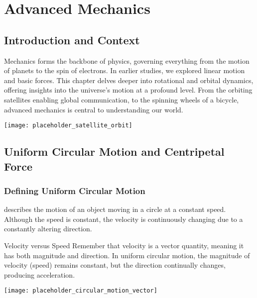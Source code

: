 \chapter{Advanced Mechanics}

\section{Introduction and Context}
\FloatBarrier
Mechanics forms the backbone of physics, governing everything from the motion of planets to the spin of electrons. In earlier studies, we explored linear motion and basic forces. This chapter delves deeper into rotational and orbital dynamics, offering insights into the universe's motion at a profound level. From the orbiting satellites enabling global communication, to the spinning wheels of a bicycle, advanced mechanics is central to understanding our world.

\begin{marginfigure}[0pt]
\texttt{[image: placeholder\_satellite\_orbit]}
\caption{Satellites and their orbits provide essential services such as communication, navigation, and weather forecasting.}
\end{marginfigure}

\section{Uniform Circular Motion and Centripetal Force}
\FloatBarrier

\subsection{Defining Uniform Circular Motion}
\FloatBarrier

 describes the motion of an object moving in a circle at a constant speed. Although the speed is constant, the velocity is continuously changing due to a constantly altering direction. 

\begin{keyconcept}{Velocity versus Speed}
Remember that velocity is a vector quantity, meaning it has both magnitude and direction. In uniform circular motion, the magnitude of velocity (speed) remains constant, but the direction continually changes, producing acceleration.
\end{keyconcept}

\begin{marginfigure}[0pt]
\texttt{[image: placeholder\_circular\_motion\_vector]}
\caption{Velocity vectors in circular motion continually change direction, pointing tangentially to the circle.}
\end{marginfigure}

